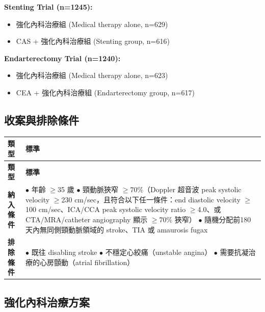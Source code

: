 \documentclass[12pt,a4paper]{article}
\begin{document}
\begin{tcolorbox}[colback=emergency_blue!5!white,colframe=emergency_blue,title=\textbf{兩個平行試驗設計}]
\textbf{Stenting Trial (n=1245):}
\begin{itemize}[noitemsep]
    \item 強化內科治療組 (Medical therapy alone, n=629)
    \item CAS + 強化內科治療組 (Stenting group, n=616)
\end{itemize}

\textbf{Endarterectomy Trial (n=1240):}
\begin{itemize}[noitemsep]
    \item 強化內科治療組 (Medical therapy alone, n=623)
    \item CEA + 強化內科治療組 (Endarterectomy group, n=617)
\end{itemize}
\end{tcolorbox}

\subsection{收案與排除條件}

\begin{longtable}{p{3cm}p{11cm}}
\toprule
\textbf{類型} & \textbf{標準} \\
\midrule
\endfirsthead

\toprule
\textbf{類型} & \textbf{標準} \\
\midrule
\endhead

\bottomrule
\endfoot

\textbf{納入條件} &
$\bullet$ 年齡 $\geq$35 歲\newline
$\bullet$ 頸動脈狹窄 $\geq$70\%（Doppler 超音波 peak systolic velocity $\geq$230 cm/sec，且符合以下任一條件：end diastolic velocity $\geq$100 cm/sec、ICA/CCA peak systolic velocity ratio $\geq$4.0、或 CTA/MRA/catheter angiography 顯示 $\geq$70\% 狹窄）\newline
$\bullet$ 隨機分配前180天內無同側頸動脈領域的 stroke、TIA 或 amaurosis fugax \\
\midrule
\textbf{排除條件} &
$\bullet$ 既往 disabling stroke\newline
$\bullet$ 不穩定心絞痛（unstable angina）\newline
$\bullet$ 需要抗凝治療的心房顫動（atrial fibrillation） \\
\bottomrule
\end{longtable}

\subsection{強化內科治療方案}
\end{document}
